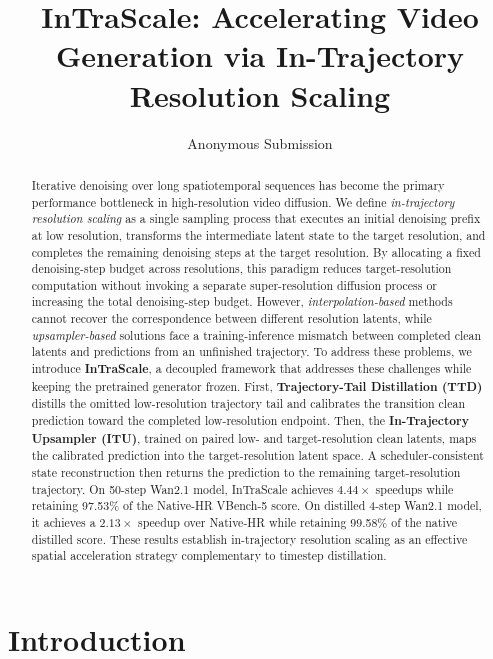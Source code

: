 \documentclass[letterpaper]{article} %
\title{InTraScale: Accelerating Video Generation via In-Trajectory Resolution Scaling}
\author{Anonymous Submission}
\begin{document}
\maketitle

\begin{abstract}
Iterative denoising over long spatiotemporal sequences has become the primary performance bottleneck in high-resolution video diffusion.
We define \emph{in-trajectory resolution scaling} as a single sampling process that executes an initial denoising prefix at low resolution, transforms the intermediate latent state to the target resolution, and completes the remaining denoising steps at the target resolution.
By allocating a fixed denoising-step budget across resolutions, this paradigm reduces target-resolution computation without invoking a separate super-resolution diffusion process or increasing the total denoising-step budget. However, \textit{interpolation-based} methods cannot recover the correspondence between different resolution latents, while \textit{upsampler-based} solutions face a training-inference mismatch between completed clean latents and predictions from an unfinished trajectory. To address these problems, we introduce \textbf{InTraScale}, a decoupled framework that addresses these challenges while keeping the pretrained generator frozen. First, \textbf{Trajectory-Tail Distillation (TTD)} distills the omitted low-resolution trajectory tail and calibrates the transition clean prediction toward the completed low-resolution endpoint. Then, the \textbf{In-Trajectory Upsampler (ITU)}, trained on paired low- and target-resolution clean latents, maps the calibrated prediction into the target-resolution latent space. A scheduler-consistent state reconstruction then returns the prediction to the remaining target-resolution trajectory. On 50-step Wan2.1 model, InTraScale achieves \(4.44\times\) speedups
while retaining 97.53\% of the Native-HR VBench-5 score. On distilled 4-step Wan2.1 model, it achieves a \(2.13\times\) speedup over Native-HR while retaining 99.58\% of the native distilled score. These results establish in-trajectory resolution scaling as an effective spatial acceleration strategy complementary to timestep distillation.
\end{abstract}



\section{Introduction}
\end{document}
